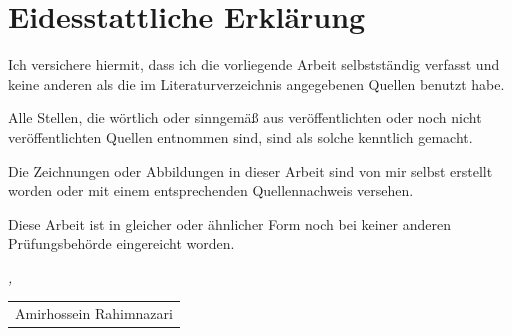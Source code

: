 %
%
%
%

\thispagestyle{empty}

\section*{Eidesstattliche Erklärung}

\noindent
Ich versichere hiermit, dass ich die vorliegende Arbeit selbstständig verfasst und
keine anderen als die im Literaturverzeichnis angegebenen Quellen benutzt habe.
\medskip

\noindent
Alle Stellen, die wörtlich oder sinngemäß aus veröffentlichten oder noch nicht
veröffentlichten Quellen entnommen sind, sind als solche kenntlich gemacht.
\medskip

\noindent
Die Zeichnungen oder Abbildungen in dieser Arbeit sind von mir selbst erstellt
worden oder mit einem entsprechenden Quellennachweis versehen.
\medskip

\noindent
Diese Arbeit ist in gleicher oder ähnlicher Form noch bei keiner anderen
Prüfungsbehörde eingereicht worden.
\bigskip

\noindent\textit{\submissionplace, \submissiondate}

\vspace{2.5em}

\begin{flushright}
  \begin{tabular}{m{6cm}}
    \\ \hline
    \centering Amirhossein Rahimnazari \\
  \end{tabular}
\end{flushright}

\clearpage
